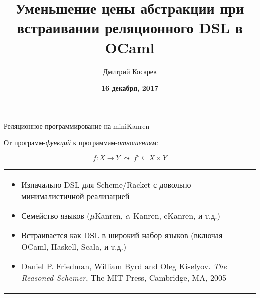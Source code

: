 \documentclass[10pt, mathserif]{beamer}
\title{Уменьшение цены абстракции при встраивании реляционного DSL в OCaml}
\author{Дмитрий Косарев}
\institute[]{
\small{
\textbf{Лаборатория языковых инструментов}
}
}
\date{
  \vskip 2cm
  \small{
  \textbf{16 декабря, 2017}
  }
}
\newcommand{\oo}[1]{{#1}^o}
\theoremstyle{definition}
\begin{document}
\begin{frame}
  \titlepage
\end{frame}

\begin{frame}{Реляционное программирование на miniKanren}
 \begin{center}
 От программ-\emph{функций} к программам-\emph{отношениям}:
 \end{center}

 $$
 f \colon X \to Y\;\leadsto\;\oo{f} \subseteq X\times Y
 $$
 \vskip5mm
 \begin{tabular}{m{4cm}m{6cm}}
    \begin{itemize}
       \item Изначально DSL для Scheme/Racket с довольно минималистичной реализацией
       \item Семейство языков ($\mu$Kanren, $\alpha$  Kanren, cKanren, и т.д.)
       \item Встраивается как DSL в широкий набор языков (включая OCaml, Haskell, Scala, и т.д.)
       \item Daniel P. Friedman, William Byrd and   Oleg Kiselyov. \emph{The Reasoned Schemer},
       The MIT Press, Cambridge, MA, 2005
    \end{itemize}
 \end{tabular}
 \vskip 3cm
\end{frame}
\end{document}
